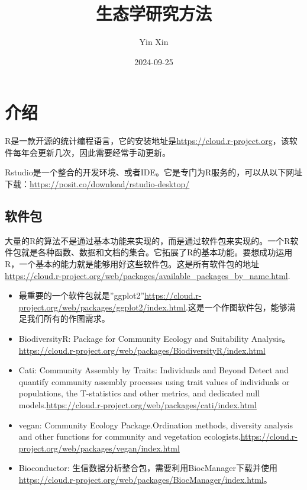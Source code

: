\documentclass[
]{book}
\title{生态学研究方法}
\author{Yin Xin}
\date{2024-09-25}
\begin{document}
\frontmatter
\maketitle

\mainmatter
\chapter{介绍}\label{ux4ecbux7ecd}

R是一款开源的统计编程语言，它的安装地址是\url{https://cloud.r-project.org}，该软件每年会更新几次，因此需要经常手动更新。

Rstudio是一个整合的开发环境、或者IDE。它是专门为R服务的，可以从以下网址下载：\url{https://posit.co/download/rstudio-desktop/}

\section{软件包}\label{ux8f6fux4ef6ux5305}

大量的R的算法不是通过基本功能来实现的，而是通过软件包来实现的。一个R软件包就是各种函数、数据和文档的集合。它拓展了R的基本功能。要想成功运用R，一个基本的能力就是能够用好这些软件包。这是所有软件包的地址\url{https://cloud.r-project.org/web/packages/available_packages_by_name.html}.

\begin{itemize}
\item
  最重要的一个软件包就是''ggplot2''\url{https://cloud.r-project.org/web/packages/ggplot2/index.html}.这是一个作图软件包，能够满足我们所有的作图需求。
\item
  BiodiversityR: Package for Community Ecology and Suitability
  Analysis。\url{https://cloud.r-project.org/web/packages/BiodiversityR/index.html}
\item
  Cati: Community Assembly by Traits: Individuals and Beyond Detect and
  quantify community assembly processes using trait values of
  individuals or populations, the T-statistics and other metrics, and
  dedicated null
  models.\url{https://cloud.r-project.org/web/packages/cati/index.html}
\item
  vegan: Community Ecology Package.Ordination methods, diversity
  analysis and other functions for community and vegetation
  ecologists.\url{https://cloud.r-project.org/web/packages/vegan/index.html}
\item
  Bioconductor:
  生信数据分析整合包，需要利用BiocManager下载并使用\url{https://cloud.r-project.org/web/packages/BiocManager/index.html}。
\end{itemize}

\backmatter
\end{document}
